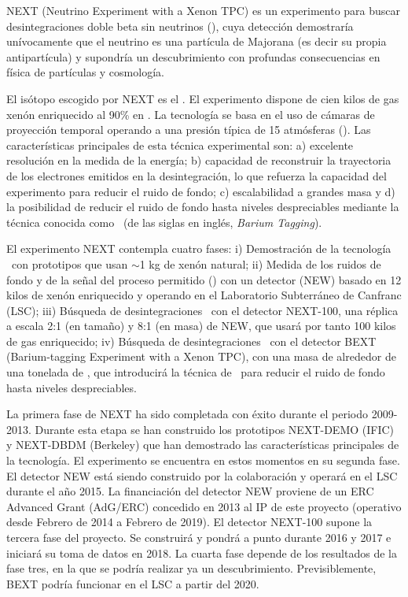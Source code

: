 
NEXT (Neutrino Experiment with a Xenon TPC) es un experimento para buscar desintegraciones doble beta sin neutrinos (\bbonu), cuya detección demostraría unívocamente que el neutrino es una partícula de Majorana (es decir su propia antipartícula) y supondría un descubrimiento con profundas consecuencias en física de partículas y cosmología. 

 El isótopo escogido por NEXT es el \XE. El experimento dispone de cien kilos de gas xenón enriquecido al 90\% en \XE. La tecnología se basa en el uso de cámaras de proyección temporal operando a una presión típica de 15 atmósferas (\HPXE). Las características principales de esta técnica experimental son: a) excelente resolución en la medida de la energía; b) capacidad de reconstruir la trayectoria de los electrones emitidos en la desintegración, lo que refuerza la capacidad del experimento para reducir el ruido de fondo; c) escalabilidad a grandes masa y d) la posibilidad de reducir el ruido de fondo hasta niveles despreciables mediante la técnica conocida como \BATA\ (de las siglas en inglés, {\em Barium Tagging}).

 El experimento NEXT contempla cuatro fases: i) Demostración de la tecnología \HPXE\ con prototipos que usan $\sim$1 kg de xenón natural; ii) Medida de los ruidos de fondo y de la señal del proceso permitido (\bbtnu) con un detector (NEW) basado en 12 kilos de xenón enriquecido y operando en el Laboratorio Subterráneo de Canfranc (LSC); iii) Búsqueda de desintegraciones \bbonu\ con el detector NEXT-100, una réplica a escala 2:1 (en tamaño) y 8:1 (en masa) de NEW, que usará por tanto 100 kilos de gas enriquecido; iv) Búsqueda de desintegraciones \bbonu\ con el detector BEXT (Barium-tagging Experiment with a Xenon TPC), con una masa de alrededor de una tonelada de \XE, que introducirá la técnica de \BATA\ para reducir el ruido de fondo hasta niveles despreciables. 

La primera fase de NEXT ha sido completada con éxito durante el periodo 2009-2013. Durante esta etapa se han construido los prototipos NEXT-DEMO (IFIC) y NEXT-DBDM (Berkeley) que han demostrado las características principales de la tecnología. El experimento se encuentra en estos momentos en su segunda fase. El detector NEW está siendo construido por la colaboración y operará en el LSC durante el año 2015. La financiación del detector NEW proviene de un ERC Advanced Grant (AdG/ERC) concedido en 2013 al IP de este proyecto (operativo desde Febrero de 2014 a Febrero de 2019). El detector NEXT-100 supone la tercera fase del proyecto. Se construirá y pondrá a punto durante 2016 y 2017 e iniciará su toma de datos en 2018. La cuarta fase depende de los resultados de la fase tres, en la que se podría realizar ya un descubrimiento. Previsiblemente, BEXT podría funcionar en el LSC a partir del 2020. 

